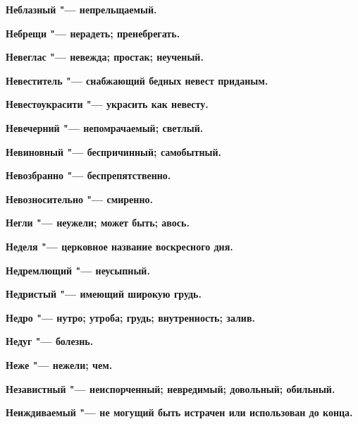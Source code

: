 \begin{multicols}{2}
\bfseries Неблазный\normalfont{} "--- непрельщаемый. 




\bfseries Небрещи\normalfont{} "--- нерадеть; пренебрегать. 




\bfseries Невеглас\normalfont{} "--- невежда; простак; неученый. 




\bfseries Невеститель\normalfont{} "--- снабжающий бедных невест приданым. 




\bfseries Невестоукрасити\normalfont{} "--- украсить как невесту. 




\bfseries Невечерний\normalfont{} "--- непомрачаемый; светлый. 




\bfseries Невиновный\normalfont{} "--- беспричинный; самобытный. 




\bfseries Невозбранно\normalfont{} "--- беспрепятственно. 




\bfseries Невозносительно\normalfont{} "--- смиренно. 




\bfseries Негли\normalfont{} "--- неужели; может быть; авось. 




\bfseries Неделя\normalfont{} "--- церковное название воскресного дня. 




\bfseries Недремлющий\normalfont{} "--- неусыпный. 




\bfseries Недристый\normalfont{} "--- имеющий широкую грудь. 




\bfseries Недро\normalfont{} "--- нутро; утроба; грудь; внутренность; залив. 




\bfseries Недуг\normalfont{} "--- болезнь. 




\bfseries Неже\normalfont{} "--- нежели; чем. 




\bfseries Независтный\normalfont{} "--- неиспорченный; невредимый; довольный; обильный. 




\bfseries Неиждиваемый\normalfont{} "--- не могущий быть истрачен или использован до конца. 





\end{multicols}
